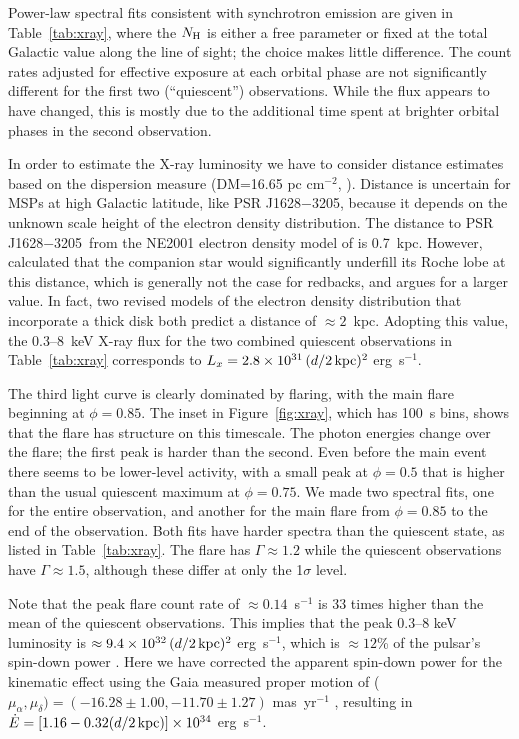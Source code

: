 \documentclass[iop]{emulateapj}
\newcommand{\mspone}{PSR J1628$-$3205}
\begin{document}
Power-law spectral fits consistent with synchrotron emission
are given in Table~\ref{tab:xray},
where the $N_{\rm H}$ is either a free parameter or fixed
at the total Galactic value along the line of sight;
the choice makes little difference.
The count rates adjusted for effective exposure
at each orbital phase are not significantly different for
the first two (``quiescent'') observations.  While the flux appears
to have changed, this is mostly due to the additional time spent
at brighter orbital phases in the second observation.

In order to estimate the X-ray luminosity
we have to consider distance estimates based on the
dispersion measure (DM=16.65 pc cm$^{-2}$, \citealt{den16}).
Distance is uncertain for MSPs at high Galactic latitude,
like \mspone, because it depends
on the unknown scale height of the electron density distribution.
The distance to \mspone\ from the NE2001 electron density model of
\cite{cor02} is 0.7~kpc.  However, \cite{den16} calculated
that the companion star would significantly underfill its Roche lobe
at this distance, which is generally not the case for redbacks,
and argues for a larger value.  In fact, two revised models of the electron
density distribution that incorporate a thick disk \citep{sch12,yao17}
both predict a distance of $\approx2$~kpc.  Adopting this value,
the 0.3--8~keV X-ray flux for the two combined quiescent observations
in Table~\ref{tab:xray} corresponds to
$L_x = 2.8\times10^{31}\,(d/2\,{\rm kpc})^2$ erg~s$^{-1}$.

The third light curve is clearly dominated by flaring, with the
main flare beginning at $\phi=0.85$.  The inset in Figure~\ref{fig:xray},
which has 100~s bins, shows that the flare has structure on this
timescale.  The photon energies change over the flare; 
the first peak is harder than the second.  Even before
the main event there seems to be lower-level activity, with a small
peak at $\phi=0.5$ that is higher than the usual quiescent maximum at
$\phi=0.75$.  We made two spectral fits, one for the entire observation,
and another for the main flare from $\phi=0.85$ to the end of the
observation.  Both fits have harder spectra than the quiescent state,
as listed in Table~\ref{tab:xray}.  The flare has $\Gamma\approx1.2$ while
the quiescent observations have $\Gamma\approx1.5$, although these differ
at only the 1$\sigma$ level.

Note that the peak flare count rate of
$\approx0.14$~s$^{-1}$ is 33 times higher than the mean of
the quiescent observations.  This implies that the peak 0.3--8 keV
luminosity is $\approx9.4\times10^{32}\,(d/2\,{\rm kpc})^2$ erg~s$^{-1}$,
which is $\approx12$\% of the pulsar's spin-down power \citep{den16}.
Here we have corrected the apparent spin-down power for the
kinematic \citep{shk70} effect using the Gaia measured proper motion of
($\mu_{\alpha},\mu_{\delta})=(-16.28\pm1.00,-11.70\pm1.27)$ mas~yr$^{-1}$
\citep{gai16a,gai16b}, resulting in
$\dot E=[1.16-0.32(d/2\,{\rm kpc})]\times10^{34}$ erg~s$^{-1}$.
\end{document}

